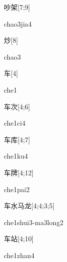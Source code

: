 \begin{verbete}{吵架}[7;9]
\begin{pronuncia}{chao3jia4}
\end{pronuncia}
\end{verbete}

\begin{verbete}[chao3]{炒}[8]
\begin{pronuncia}{chao3}
\end{pronuncia}
\end{verbete}

\begin{verbete}[che1]{车}[4]
\begin{pronuncia}{che1}
\end{pronuncia}
\end{verbete}

\begin{verbete}[che1ci4]{车次}[4;6]
\begin{pronuncia}{che1ci4}
\end{pronuncia}
\end{verbete}

\begin{verbete}[che1ku4]{车库}[4;7]
\begin{pronuncia}{che1ku4}
\end{pronuncia}
\end{verbete}

\begin{verbete}{车牌}[4;12]
\begin{pronuncia}{che1pai2}
\end{pronuncia}
\end{verbete}

\begin{verbete}{车水马龙}[4;4;3;5]
\begin{pronuncia}[\\]{che1shui3-ma3long2}
\end{pronuncia}
\end{verbete}

\begin{verbete}{车站}[4;10]
\begin{pronuncia}{che1zhan4}
\end{pronuncia}
\end{verbete}

